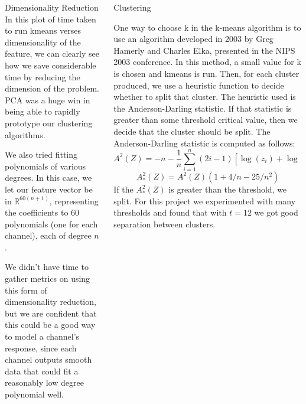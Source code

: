 \documentclass[final,t]{beamer}
\begin{document}
\begin{frame}{}
\begin{columns}[t]
\begin{column}{.3\linewidth}
\begin{block}{Dimensionality Reduction}
In this plot of time taken to run kmeans verses dimensionality of the
feature, we can clearly see how we save considerable time by reducing the
dimension of the problem. PCA was a huge win in being able to rapidly
prototype our clustering algorithms.

       \par
         We also tried fitting polynomials of various degrees. In this
         case, we let our feature vector be in $\mathbb{R}^{60(n+1)}$,
         representing the coefficients to 60 polynomials (one for each
         channel), each of degree $n$.

         We didn't have time to gather metrics on using this form of
         dimensionality reduction, but we are confident that this could be
         a good way to model a channel's response, since each channel
         outputs smooth data that could fit a reasonably low degree
         polynomial well.
     \end{block}
   \end{column}
   
    
    \begin{column}{.3\linewidth}
      \begin{block}{Clustering}
        \par
        One way to choose k in the k-means algorithm is to use an algorithm
developed in 2003 by Greg Hamerly and Charles Elka, presented in the NIPS
2003 conference. In this method, a small value for k is
chosen and kmeans is run. Then, for each cluster produced, we use a
heuristic function to decide whether to split that cluster. The heuristic
used is the Anderson-Darling statistic. If that statistic is greater than
some threshold critical value, then we decide that the cluster should be
split. The Anderson-Darling statistic is computed as follows:
$$
A^2(Z) = -n - \frac{1}{n}\sum_{i=1}^n (2i -
1)[\log(z_i)+\log(1-z_{n+1-i})]
$$$$
A^2_*(Z) = A^2(Z)(1 + 4/n - 25/n^2)
$$
If the $A^2_*(Z)$ is greater than the threshold, we split. For this
project we experimented with many thresholds and found that with $t=12$ we
got good separation between clusters.



\end{block}
\end{column}
\end{columns}
\end{frame}
\end{document}
